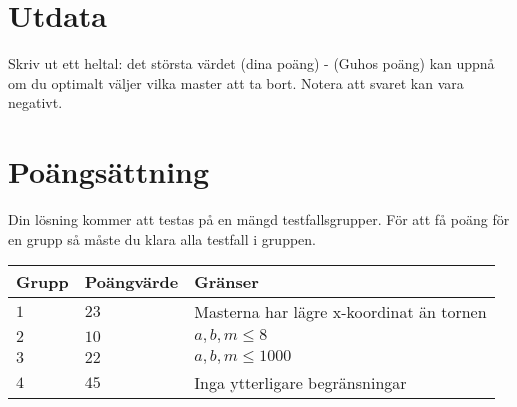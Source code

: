 \section*{Utdata}
Skriv ut ett heltal: det största värdet (dina poäng) - (Guhos poäng) kan uppnå om du optimalt väljer vilka master att ta bort. Notera att svaret kan vara negativt.

\section*{Poängsättning}
Din lösning kommer att testas på en mängd testfallsgrupper.
För att få poäng för en grupp så måste du klara alla testfall i gruppen.

\noindent
\begin{tabular}{| l | l | p{12cm} |}
  \hline
  Grupp & Poängvärde & Gränser \\ \hline
  $1$   & $23$       & Masterna har lägre x-koordinat än tornen \\ \hline
  $2$   & $10$       & $a,b,m \leq 8$\\ \hline
  $3$   & $22$       & $a,b,m \leq 1000$  \\ \hline
  $4$   & $45$       & Inga ytterligare begränsningar  \\ \hline
\end{tabular}
